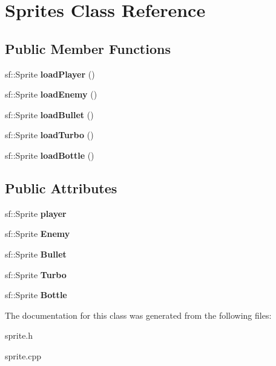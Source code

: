 \hypertarget{classSprites}{}\section{Sprites Class Reference}
\label{classSprites}
\subsection*{Public Member Functions}
\begin{DoxyCompactItemize}
\item 
\mbox{\label{classSprites_addbdc78292c420e622f2813c154beb36}} 
sf\+::\+Sprite {\bfseries load\+Player} ()
\item 
\mbox{\label{classSprites_a0539a67ac6ef4c17447c5fd0b020192f}} 
sf\+::\+Sprite {\bfseries load\+Enemy} ()
\item 
\mbox{\label{classSprites_a03a6759ab2eafb0f1ddc7ec63e037069}} 
sf\+::\+Sprite {\bfseries load\+Bullet} ()
\item 
\mbox{\label{classSprites_a75832b056ea0b23f4ab2ac98d31bd2fc}} 
sf\+::\+Sprite {\bfseries load\+Turbo} ()
\item 
\mbox{\label{classSprites_a4bb7343c93c3850de9390588bab6f58b}} 
sf\+::\+Sprite {\bfseries load\+Bottle} ()
\end{DoxyCompactItemize}
\subsection*{Public Attributes}
\begin{DoxyCompactItemize}
\item 
\mbox{\label{classSprites_ae411cf31bf71bffc1bace9495a44e3c8}} 
sf\+::\+Sprite {\bfseries player}
\item 
\mbox{\label{classSprites_a7a455b9985b37f7e172d8dd8a9133f7c}} 
sf\+::\+Sprite {\bfseries Enemy}
\item 
\mbox{\label{classSprites_a89fc2678134845682dda38aaa02d0113}} 
sf\+::\+Sprite {\bfseries Bullet}
\item 
\mbox{\label{classSprites_a32c572a48ad9694c2542c399a9fe86a8}} 
sf\+::\+Sprite {\bfseries Turbo}
\item 
\mbox{\label{classSprites_aa993013a9b030849defd31a330e2dfbd}} 
sf\+::\+Sprite {\bfseries Bottle}
\end{DoxyCompactItemize}


The documentation for this class was generated from the following files\+:\begin{DoxyCompactItemize}
\item 
sprite.\+h\item 
sprite.\+cpp\end{DoxyCompactItemize}
